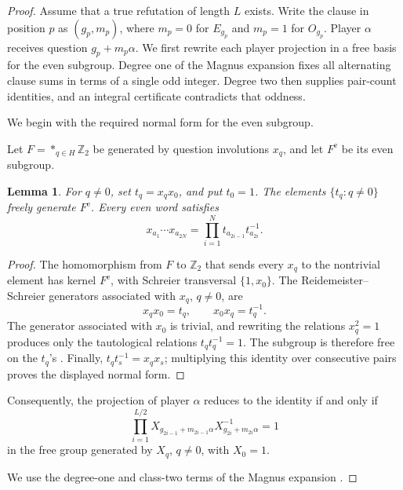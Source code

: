 \documentclass[11pt]{article}
\newtheorem{lemma}[theorem]{Lemma}
\theoremstyle{definition}
\theoremstyle{remark}
\numberwithin{equation}{section}
\begin{document}
\begin{proof}
Assume that a true refutation of length
\(L\) exists.  Write the clause in position \(p\) as \((g_p,m_p)\), where
\(m_p=0\) for \(E_{g_p}\) and \(m_p=1\) for \(O_{g_p}\).  Player
\(\alpha\) receives question \(g_p+m_p\alpha\).
We first rewrite each player projection in a free basis for the even
subgroup.  Degree one of the Magnus expansion fixes all alternating clause
sums in terms of a single odd integer.  Degree two then supplies pair-count
identities, and an integral certificate contradicts that oddness.

We begin with the required normal form for the even subgroup.

Let \(F=\ast_{q\in H}\mathbb Z_2\) be generated by question involutions
\(x_q\), and let \(F^{\mathrm e}\) be its even subgroup.

\begin{lemma}\label{lem:even-subgroup}
For \(q\ne0\), set \(t_q=x_qx_0\), and put \(t_0=1\).  The elements
\(\{t_q:q\ne0\}\) freely generate \(F^{\mathrm e}\).  Every even word
satisfies
\[
  x_{a_1}\cdots x_{a_{2N}}
  =
  \prod_{i=1}^N t_{a_{2i-1}}t_{a_{2i}}^{-1}.
\]
\end{lemma}

\begin{proof}
The homomorphism from \(F\) to \(\mathbb Z_2\) that sends every \(x_q\) to
the nontrivial element has kernel \(F^{\mathrm e}\), with Schreier transversal
\(\{1,x_0\}\).  The Reidemeister--Schreier generators associated with
\(x_q\), \(q\ne0\), are
\[
  x_qx_0=t_q,
  \qquad
  x_0x_q=t_q^{-1}.
\]
The generator associated with \(x_0\) is trivial, and rewriting the
relations \(x_q^2=1\) produces only the tautological relations
\(t_qt_q^{-1}=1\).  The subgroup is therefore free on the \(t_q\)'s
\cite{MagnusKarrassSolitar1976}.  Finally,
\(t_qt_s^{-1}=x_qx_s\); multiplying this identity over consecutive pairs
proves the displayed normal form.
\end{proof}

Consequently, the projection of player \(\alpha\) reduces to the identity
if and only if
\begin{equation}\label{eq:player-normal-form}
  \prod_{i=1}^{L/2}
  X_{g_{2i-1}+m_{2i-1}\alpha}
  X_{g_{2i}+m_{2i}\alpha}^{-1}
  =1
\end{equation}
in the free group generated by \(X_q\), \(q\ne0\), with \(X_0=1\).

We use the degree-one and class-two terms of the Magnus expansion
\cite{Magnus1937,MagnusKarrassSolitar1976}.


\end{proof}
\end{document}
